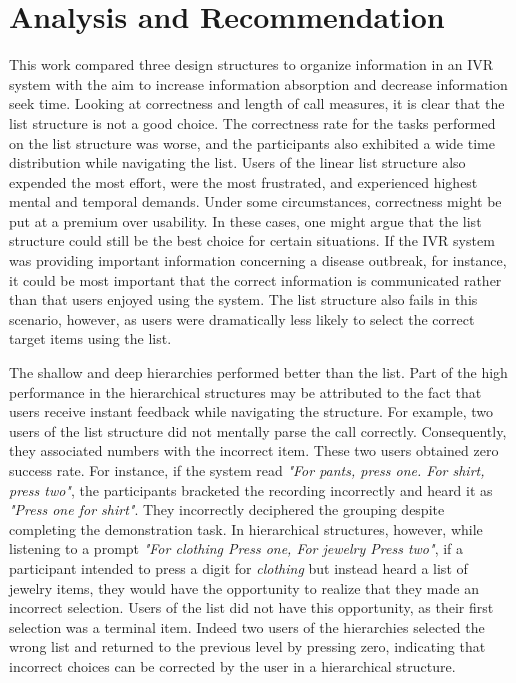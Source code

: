 \documentclass{sigchi}
\begin{document}
\section{Analysis and Recommendation}
This work compared three design structures to organize information in an IVR system with the aim to increase information absorption and decrease information seek time. Looking at correctness and length of call measures, it is clear that the list structure is not a good choice. The correctness rate for the tasks performed on the list structure was worse, and the participants also exhibited a wide time distribution while navigating the list. Users of the linear list structure also expended the most effort, were the most frustrated, and experienced highest mental and temporal demands. Under some circumstances, correctness might be put at a premium over usability. In these cases, one might argue that the list structure could still be the best choice for certain situations. If the IVR system was providing important information concerning a disease outbreak, for instance, it could be most important that the correct information is communicated rather than that users enjoyed using the system. The list structure also fails in this scenario, however, as users were dramatically less likely to select the correct target items using the list.

The shallow and deep hierarchies performed better than the list. Part of the high performance in the hierarchical structures may be attributed to the fact that users receive instant feedback while navigating the structure. For example, two users of the list structure did not mentally parse the call correctly. Consequently, they associated numbers with the incorrect item. These two users obtained zero success rate. For instance, if the system read \textit{"For pants, press one. For shirt, press two"}, the participants bracketed the recording incorrectly and heard it as \textit{"Press one for shirt"}. They incorrectly deciphered the grouping despite completing the demonstration task. In hierarchical structures, however, while listening to a prompt \textit{"For clothing Press one, For jewelry Press two"}, if a participant intended to press a digit for \textit{clothing} but instead heard a list of jewelry items, they would have the opportunity to realize that they made an incorrect selection. Users of the list did not have this opportunity, as their first selection was a terminal item. Indeed two users of the hierarchies selected the wrong list and returned to the previous level by pressing zero, indicating that incorrect choices can be corrected by the user in a hierarchical structure.
\end{document}

